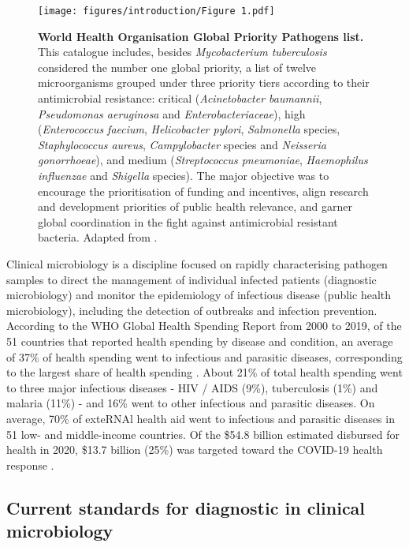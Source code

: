\begin{figure}[h!]
\centering
\texttt{[image: figures/introduction/Figure 1.pdf]}
\caption{\textbf{World Health Organisation Global Priority Pathogens list.} This catalogue includes, besides \textit{Mycobacterium tuberculosis} considered the number one global priority, a list of twelve microorganisms grouped under three priority tiers according to their antimicrobial resistance: critical (\textit{Acinetobacter baumannii}, \textit{Pseudomonas aeruginosa} and \textit{Enterobacteriaceae}), high (\textit{Enterococcus faecium}, \textit{Helicobacter pylori}, \textit{Salmonella} species, \textit{Staphylococcus aureus}, \textit{Campylobacter} species and \textit{Neisseria gonorrhoeae}), and medium (\textit{Streptococcus pneumoniae}, \textit{Haemophilus influenzae} and \textit{Shigella} species). The major objective was to encourage the prioritisation of funding and incentives, align research and development priorities of public health relevance, and garner global coordination in the fight against antimicrobial resistant bacteria. Adapted from \cite{world_health_organization_prioritization_2017}.}
\label{fig:figure1}
\end{figure}

Clinical microbiology is a discipline focused on rapidly characterising pathogen samples to direct the management of individual infected patients (diagnostic microbiology) and monitor the epidemiology of infectious disease (public health microbiology), including the detection of outbreaks and infection prevention. 
According to the \ac{WHO} Global Health Spending Report from 2000 to 2019, of the 51 countries that reported health spending by disease and condition, an average of 37\% of health spending went to infectious and parasitic diseases, corresponding to the largest share of health spending \citep{world_health_organization_global_2021}. 
About 21\% of total health spending went to three major infectious diseases - HIV / AIDS (9\%), tuberculosis (1\%) and malaria (11\%) - and 16\% went to other infectious and parasitic diseases. 
On average, 70\% of exte\ac{RNA}l health aid went to infectious and parasitic diseases in 51 low- and middle-income countries. 
Of the \$54.8 billion estimated disbursed for health in 2020, \$13.7 billion (25\%) was targeted toward the COVID-19 health response \citep{micah_tracking_2021}.

\subsection{Current standards for diagnostic in clinical microbiology} \label{ssec:_intro_current_standards}

